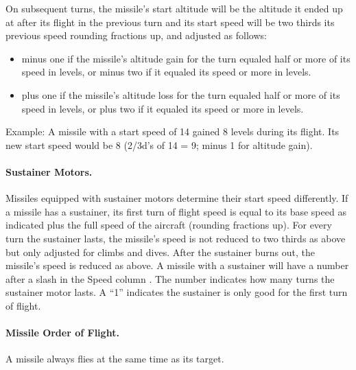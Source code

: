 On subsequent turns, the missile's start altitude will be the altitude it ended up at after its flight in the previous turn and its start speed will be two thirds its previous speed rounding fractions up, and adjusted as follows:

\begin{itemize}

    \item minus one if the missile's altitude gain for the turn equaled half or more of its speed in levels, or minus two if it equaled its speed or more in levels.

    \item plus one if the missile's altitude loss for the turn equaled half or more of its speed in levels, or plus two if it equaled its speed or more in levels.

\end{itemize}

Example: A missile with a start speed of 14 gained 8 levels during its flight. Its new start speed would be 8 (2/3d's of 14 = 9; minus 1 for altitude gain).

\paragraph{Sustainer Motors.} Missiles equipped with sustainer motors determine their start speed differently. If a missile has a sustainer, its first turn of flight speed is equal to its base speed as indicated  plus the full speed of the aircraft (rounding fractions up). For every turn the sustainer lasts, the missile's speed is not reduced to two thirds as above but only adjusted for climbs and dives. After the sustainer burns out, the missile's speed is reduced as above. A missile with a sustainer will have a number after a slash in the Speed column . The number indicates how many turns the sustainer motor lasts.  A “1” indicates the sustainer is only good for the first turn of flight.

\paragraph{Missile Order of Flight.} A missile always flies at the same time as its target.

